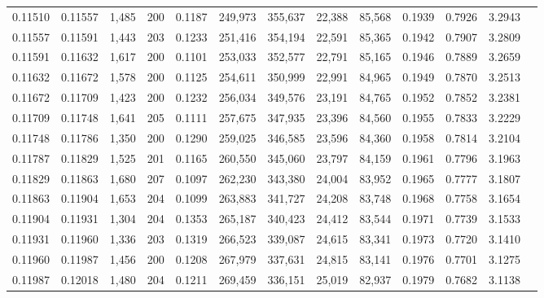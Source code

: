 \begin{tabular}{rrrrrrrrrrrrr}
0.11510 & 0.11557 & 1,485 & 200 &                                     0.1187 & 249,973 & 355,637 &  22,388 &  85,568 & 0.1939 & 0.7926 & 3.2943 \\
0.11557 & 0.11591 & 1,443 & 203 &                                     0.1233 & 251,416 & 354,194 &  22,591 &  85,365 & 0.1942 & 0.7907 & 3.2809 \\
0.11591 & 0.11632 & 1,617 & 200 &                                     0.1101 & 253,033 & 352,577 &  22,791 &  85,165 & 0.1946 & 0.7889 & 3.2659 \\
0.11632 & 0.11672 & 1,578 & 200 &                                     0.1125 & 254,611 & 350,999 &  22,991 &  84,965 & 0.1949 & 0.7870 & 3.2513 \\
0.11672 & 0.11709 & 1,423 & 200 &                                     0.1232 & 256,034 & 349,576 &  23,191 &  84,765 & 0.1952 & 0.7852 & 3.2381 \\
0.11709 & 0.11748 & 1,641 & 205 &                                     0.1111 & 257,675 & 347,935 &  23,396 &  84,560 & 0.1955 & 0.7833 & 3.2229 \\
0.11748 & 0.11786 & 1,350 & 200 &                                     0.1290 & 259,025 & 346,585 &  23,596 &  84,360 & 0.1958 & 0.7814 & 3.2104 \\
0.11787 & 0.11829 & 1,525 & 201 &                                     0.1165 & 260,550 & 345,060 &  23,797 &  84,159 & 0.1961 & 0.7796 & 3.1963 \\
0.11829 & 0.11863 & 1,680 & 207 &                                     0.1097 & 262,230 & 343,380 &  24,004 &  83,952 & 0.1965 & 0.7777 & 3.1807 \\
0.11863 & 0.11904 & 1,653 & 204 &                                     0.1099 & 263,883 & 341,727 &  24,208 &  83,748 & 0.1968 & 0.7758 & 3.1654 \\
0.11904 & 0.11931 & 1,304 & 204 &                                     0.1353 & 265,187 & 340,423 &  24,412 &  83,544 & 0.1971 & 0.7739 & 3.1533 \\
0.11931 & 0.11960 & 1,336 & 203 &                                     0.1319 & 266,523 & 339,087 &  24,615 &  83,341 & 0.1973 & 0.7720 & 3.1410 \\
0.11960 & 0.11987 & 1,456 & 200 &                                     0.1208 & 267,979 & 337,631 &  24,815 &  83,141 & 0.1976 & 0.7701 & 3.1275 \\
0.11987 & 0.12018 & 1,480 & 204 &                                     0.1211 & 269,459 & 336,151 &  25,019 &  82,937 & 0.1979 & 0.7682 & 3.1138 \\

\end{tabular}

